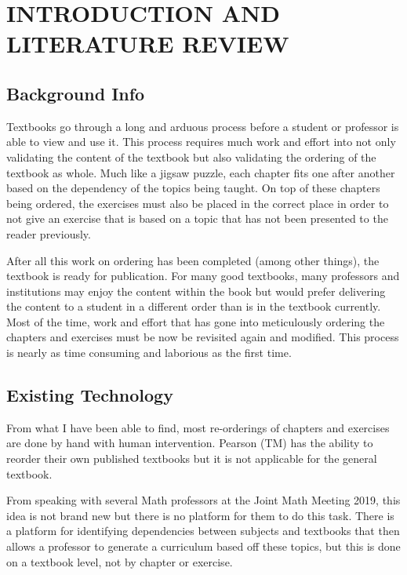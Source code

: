%
%
%
%


\pagestyle{plain} %

\chapter{INTRODUCTION AND LITERATURE REVIEW}

\section{Background Info}

Textbooks go through a long and arduous process before a student or professor is able to view and use it. This process requires much work and effort into not only validating the content of the textbook but also validating the ordering of the textbook as whole. Much like a jigsaw puzzle, each chapter fits one after another based on the dependency of the topics being taught. On top of these chapters being ordered, the exercises must also be placed in the correct place in order to not give an exercise that is based on a topic that has not been presented to the reader previously.

After all this work on ordering has been completed (among other things), the textbook is ready for publication. For many good textbooks, many professors and institutions may enjoy the content within the book but would prefer delivering the content to a student in a different order than is in the textbook currently. Most of the time, work and effort that has gone into meticulously ordering the chapters and exercises must be now be revisited again and modified. This process is nearly as time consuming and laborious as the first time.

\section{Existing Technology}

From what I have been able to find, most re-orderings of chapters and exercises are done by hand with human intervention. Pearson (TM) has the ability to reorder their own published textbooks but it is not applicable for the general textbook.

From speaking with several Math professors at the Joint Math Meeting 2019, this idea is not brand new but there is no platform for them to do this task. There is a platform for identifying dependencies between subjects and textbooks that then allows a professor to generate a curriculum based off these topics, but this is done on a textbook level, not by chapter or exercise.

